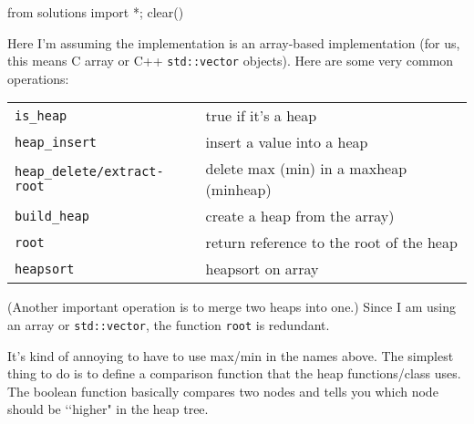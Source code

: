 %
%

\begin{python0}
from solutions import *; clear()
\end{python0}

Here I'm assuming the implementation is an array-based implementation
(for us, this means C array or C++ \verb!std::vector! objects).
Here are some very common operations:

\begin{longtable}{l|l}
\hline
\texttt{is\_heap}                   & true if it's a heap \\
\texttt{heap\_insert}               & insert a value into a heap \\
\texttt{heap\_delete/extract-root}  & delete max (min) in a maxheap (minheap) \\
\texttt{build\_heap}           & create a heap from the array) \\
\texttt{root}                  & return reference to the root of the heap \\
\texttt{heapsort}              & heapsort on array \\
\hline
\end{longtable}
(Another important operation is to merge two heaps into one.)
Since I am using an array or \verb!std::vector!, the function \verb!root!
is redundant.

It's kind of annoying to have to use max/min in the names above.
The simplest thing to do is to define a comparison function that the
heap functions/class uses.
The boolean function basically compares two nodes and tells you
which node should be \lq\lq higher" in the heap tree.
